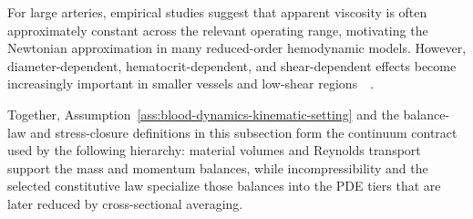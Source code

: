 \begin{remark}
    \label{rmk:newtonian-justification}
    For large arteries, empirical studies suggest that apparent viscosity is often
    approximately constant across the relevant operating range, motivating the
    Newtonian approximation in many reduced-order hemodynamic models. However,
    diameter-dependent, hematocrit-dependent, and shear-dependent effects become
    increasingly important in smaller vessels and low-shear
    regions~\cite[Sec.~1.1.3, pp.~12--14]{KopplHelmig2023DimensionReducedModeling}~\cite{PriesEtAl1992BloodViscosityTubeFlow}.
\end{remark}

Together, Assumption~\ref{ass:blood-dynamics-kinematic-setting} and the
balance-law and stress-closure definitions in this subsection form the
continuum contract used by the following hierarchy: material volumes and
Reynolds transport support the mass and momentum balances, while
incompressibility and the selected constitutive law specialize those balances
into the PDE tiers that are later reduced by cross-sectional averaging.
